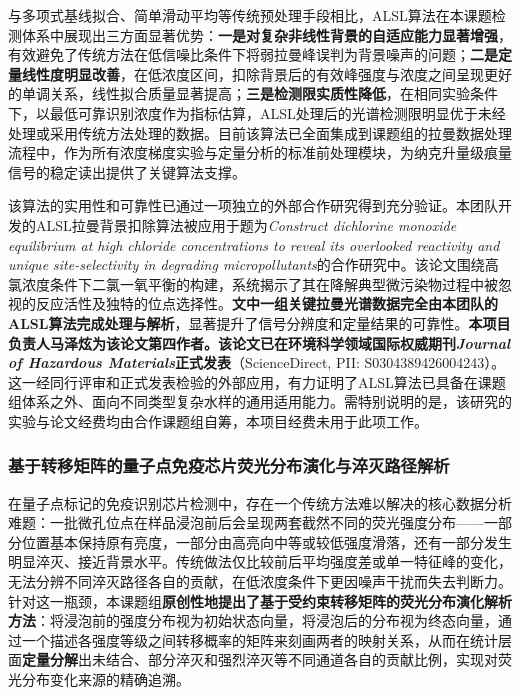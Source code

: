 \documentclass[12pt,a4paper]{article}
\begin{document}
与多项式基线拟合、简单滑动平均等传统预处理手段相比，ALSL算法在本课题检测体系中展现出三方面显著优势：\textbf{一是对复杂非线性背景的自适应能力显著增强}，有效避免了传统方法在低信噪比条件下将弱拉曼峰误判为背景噪声的问题；\textbf{二是定量线性度明显改善}，在低浓度区间，扣除背景后的有效峰强度与浓度之间呈现更好的单调关系，线性拟合质量显著提高；\textbf{三是检测限实质性降低}，在相同实验条件下，以最低可靠识别浓度作为指标估算，ALSL处理后的光谱检测限明显优于未经处理或采用传统方法处理的数据。目前该算法已全面集成到课题组的拉曼数据处理流程中，作为所有浓度梯度实验与定量分析的标准前处理模块，为纳克升量级痕量信号的稳定读出提供了关键算法支撑。

该算法的实用性和可靠性已通过一项独立的外部合作研究得到充分验证。本团队开发的ALSL拉曼背景扣除算法被应用于题为\textit{Construct dichlorine monoxide equilibrium at high chloride concentrations to reveal its overlooked reactivity and unique site-selectivity in degrading micropollutants}的合作研究中。该论文围绕高氯浓度条件下二氯一氧平衡的构建，系统揭示了其在降解典型微污染物过程中被忽视的反应活性及独特的位点选择性。\textbf{文中一组关键拉曼光谱数据完全由本团队的ALSL算法完成处理与解析}，显著提升了信号分辨度和定量结果的可靠性。\textbf{本项目负责人马泽炫为该论文第四作者。该论文已在环境科学领域国际权威期刊\textit{Journal of Hazardous Materials}正式发表}（ScienceDirect, PII: S0304389426004243）。这一经同行评审和正式发表检验的外部应用，有力证明了ALSL算法已具备在课题组体系之外、面向不同类型复杂水样的通用适用能力。需特别说明的是，该研究的实验与论文经费均由合作课题组自筹，本项目经费未用于此项工作。

\subsubsection{基于转移矩阵的量子点免疫芯片荧光分布演化与淬灭路径解析}

在量子点标记的免疫识别芯片检测中，存在一个传统方法难以解决的核心数据分析难题：一批微孔位点在样品浸泡前后会呈现两套截然不同的荧光强度分布——一部分位置基本保持原有亮度，一部分由高亮向中等或较低强度滑落，还有一部分发生明显淬灭、接近背景水平。传统做法仅比较前后平均强度差或单一特征峰的变化，无法分辨不同淬灭路径各自的贡献，在低浓度条件下更因噪声干扰而失去判断力。针对这一瓶颈，本课题组\textbf{原创性地提出了基于受约束转移矩阵的荧光分布演化解析方法}：将浸泡前的强度分布视为初始状态向量，将浸泡后的分布视为终态向量，通过一个描述各强度等级之间转移概率的矩阵来刻画两者的映射关系，从而在统计层面\textbf{定量分解}出未结合、部分淬灭和强烈淬灭等不同通道各自的贡献比例，实现对荧光分布变化来源的精确追溯。
\end{document}
